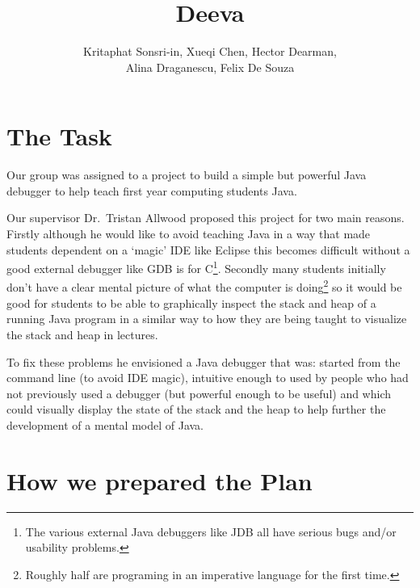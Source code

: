 \documentclass[11pt]{article}
\newcommand{\subtitle}[1]{%
  \posttitle{%
    \par\end{center}
    \begin{center}\large#1\end{center}
    \vskip0.5em}%
}
\begin{document}
\title{Deeva}
\subtitle{Planing Report}
\author{Kritaphat Sonsri-in, Xueqi Chen, Hector Dearman, \\Alina Draganescu, Felix De Souza}

\maketitle

\section{The Task}
Our group was assigned to a project to build a simple but powerful Java debugger to help teach first year computing students Java.

Our supervisor Dr.~Tristan Allwood proposed this project for two main reasons.
Firstly although he would like to avoid teaching Java in a way that made students dependent on a `magic' IDE like Eclipse this becomes difficult without a good external debugger like GDB is for C\footnote{The various external Java debuggers like JDB all have serious bugs and/or usability problems.}.
Secondly many students initially don't have a clear mental picture of what the computer is doing\footnote{Roughly half are programing in an imperative language for the first time.} so it would be good for students to be able to graphically inspect the stack and heap of a running Java program in a similar way to how they are being taught to visualize the stack and heap in lectures.

To fix these problems he envisioned a Java debugger that was: started from the command line (to avoid IDE magic), intuitive enough to used by people who had not previously used a debugger (but powerful enough to be useful) and which could visually display the state of the stack and the heap to help further the development of a mental model of Java.


\section{How we prepared the Plan}
\end{document}
